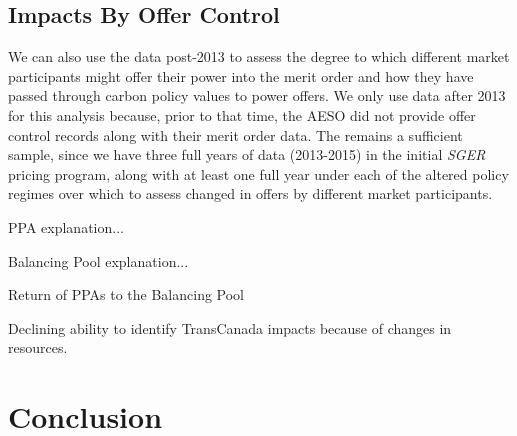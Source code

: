 \documentclass[12pt]{article}
\newcommand{\SGER}{\textit{SGER} }
\begin{document}
\subsection{Impacts By Offer Control}
We can also use the data post-2013 to assess the degree to which different market participants might offer their power into the merit order and how they have passed through carbon policy values to power offers. We only use data after 2013 for this analysis because, prior to that time, the AESO did not provide offer control records along with their merit order data. The remains a sufficient sample, since we have three full years of data (2013-2015) in the initial \SGER pricing program, along with at least one full year under each of the altered policy regimes over which to assess changed in offers by different market participants.

PPA explanation...

Balancing Pool explanation...

Return of PPAs to the Balancing Pool

Declining ability to identify TransCanada impacts because of changes in resources.





\section{Conclusion}




\end{document}
